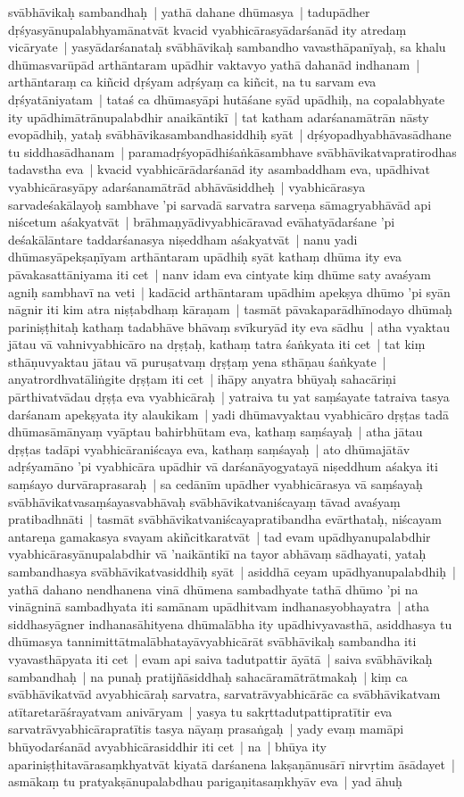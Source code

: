 \documentclass[article,12pt,a4paper]{memoir}%
\begin{document}
svābhāvikaḥ sambandhaḥ | yathā dahane dhūmasya | tadupādher dṛśyasyānupalabhyamānatvāt kvacid vyabhicārasyādarśanād ity atredaṃ vicāryate | yasyādarśanataḥ svābhāvikaḥ sambandho vavasthāpanīyaḥ, sa khalu dhūmasvarūpād arthāntaram upādhir vaktavyo yathā dahanād indhanam | arthāntaraṃ ca kiñcid dṛśyam adṛśyaṃ ca kiñcit, na tu sarvam eva dṛśyatāniyatam | tataś ca dhūmasyāpi hutāśane syād upādhiḥ, na copalabhyate ity upādhimātrānupalabdhir anaikāntikī | tat katham adarśanamātrān nāsty evopādhiḥ, yataḥ svābhāvikasambandhasiddhiḥ syāt | dṛśyopadhyabhāvasādhane tu siddhasādhanam | paramadṛśyopādhiśaṅkāsambhave svābhāvikatvapratirodhas tadavstha eva | kvacid vyabhicārādarśanād ity asambaddham eva, upādhivat vyabhicārasyāpy adarśanamātrād abhāvāsiddheḥ | vyabhicārasya sarvadeśakālayoḥ sambhave 'pi sarvadā sarvatra sarveṇa sāmagryabhāvād api niścetum aśakyatvāt | brāhmaṇyādivyabhicāravad evāhatyādarśane 'pi deśakālāntare taddarśanasya niṣeddham aśakyatvāt | \label{thakur75-110.7} nanu yadi dhūmasyāpekṣaṇīyam arthāntaram upādhiḥ syāt kathaṃ dhūma ity eva pāvakasattāniyama iti cet | nanv idam eva cintyate kiṃ dhūme saty avaśyam agniḥ sambhavī na veti | kadācid arthāntaram upādhim apekṣya dhūmo 'pi syān nāgnir iti kim atra niṣṭabdhaṃ kāraṇam | tasmāt pāvakaparādhīnodayo dhūmaḥ pariniṣṭhitaḥ kathaṃ tadabhāve bhāvaṃ svīkuryād ity eva sādhu | \label{thakur75-110.12} atha vyaktau jātau vā vahnivyabhicāro na dṛṣṭaḥ, kathaṃ tatra śaṅkyata iti cet | tat kiṃ sthāṇuvyaktau jātau vā puruṣatvaṃ dṛṣṭaṃ yena sthāṇau śaṅkyate | anyatrordhvatāliṅgite dṛṣṭam iti cet | ihāpy anyatra bhūyaḥ sahacāriṇi pārthivatvādau dṛṣṭa eva vyabhicāraḥ | yatraiva tu yat saṃśayate tatraiva tasya darśanam apekṣyata ity alaukikam | yadi dhūmavyaktau vyabhicāro dṛṣṭas tadā dhūmasāmānyaṃ vyāptau bahirbhūtam eva, kathaṃ saṃśayaḥ | atha jātau dṛṣṭas tadāpi vyabhicāraniścaya eva, kathaṃ saṃśayaḥ | ato dhūmajātāv adṛśyamāno 'pi vyabhicāra upādhir vā darśanāyogyatayā niṣeddhum aśakya iti saṃśayo durvāraprasaraḥ | sa cedānīm upādher vyabhicārasya vā saṃśayaḥ svābhāvikatvasaṃśayasvabhāvaḥ svābhāvikatvaniścayaṃ tāvad avaśyaṃ pratibadhnāti | tasmāt svābhāvikatvaniścayapratibandha evārthataḥ, niścayam antareṇa gamakasya svayam akiñcitkaratvāt | tad evam upādhyanupalabdhir vyabhicārasyānupalabdhir vā 'naikāntikī na tayor abhāvaṃ sādhayati, yataḥ sambandhasya svābhāvikatvasiddhiḥ syāt | asiddhā ceyam upādhyanupalabdhiḥ | yathā dahano nendhanena vinā dhūmena sambadhyate tathā dhūmo 'pi na vināgninā sambadhyata iti samānam upādhitvam indhanasyobhayatra | \label{thakur75-110.26} atha siddhasyāgner indhanasāhityena dhūmalābha ity upādhivyavasthā, asiddhasya tu dhūmasya tannimittātmalābhatayāvyabhicārāt svābhāvikaḥ sambandha iti vyavasthāpyata iti cet | evam api saiva tadutpattir āyātā | saiva svābhāvikaḥ sambandhaḥ | na punaḥ pratijñāsiddhaḥ sahacāramātrātmakaḥ | kiṃ ca svābhāvikatvād avyabhicāraḥ sarvatra, sarvatrāvyabhicārāc ca svābhāvikatvam atītaretarāśrayatvam anivāryam | yasya tu sakṛttadutpattipratītir eva sarvatrāvyabhicārapratītis tasya nāyaṃ prasaṅgaḥ | \label{thakur75-110.32} yady evaṃ mamāpi bhūyodarśanād avyabhicārasiddhir iti cet | na | bhūya ity apariniṣṭhitavārasaṃkhyatvāt kiyatā darśanena lakṣaṇānusārī nirvṛtim āsādayet | asmākaṃ tu pratyakṣānupalabdhau parigaṇitasaṃkhyāv eva | yad āhuḥ
\end{document}

